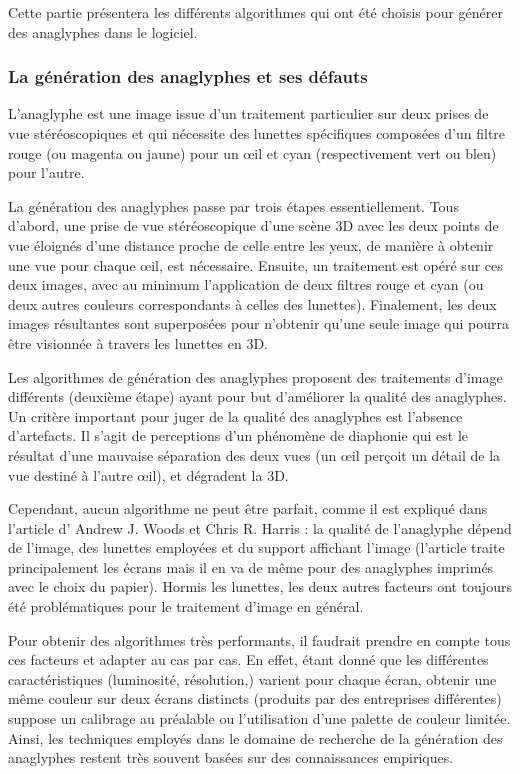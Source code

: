 Cette partie présentera les différents algorithmes qui ont été choisis pour générer des anaglyphes dans le logiciel.

\subsubsection{La génération des anaglyphes et ses défauts}
	L'anaglyphe est une image issue d'un traitement particulier sur deux prises de vue stéréoscopiques et qui nécessite des lunettes spécifiques composées d'un filtre rouge (ou magenta ou jaune) pour un \oe il et cyan (respectivement vert ou bleu) pour l'autre. 
	
	La génération des anaglyphes passe par trois étapes essentiellement. Tous d'abord, une prise de vue stéréoscopique d'une scène 3D avec les deux points de vue éloignés d'une distance proche de celle entre les yeux, de manière à obtenir une vue pour chaque \oe il, est nécessaire. Ensuite, un traitement est opéré sur ces deux images, avec au minimum l'application de deux filtres rouge et cyan (ou deux autres couleurs correspondants à celles des lunettes). Finalement, les deux images résultantes sont superposées pour n'obtenir qu'une seule image qui pourra être visionnée à travers les lunettes en 3D.
	
	Les algorithmes de génération des anaglyphes proposent des traitements d'image différents (deuxième étape) ayant pour but d'améliorer la qualité des anaglyphes. Un critère important pour juger de la qualité des anaglyphes est l'absence d'artefacts. Il s'agit de perceptions d'un phénomène de diaphonie qui est le résultat d'une mauvaise séparation des deux vues (un \oe il perçoit un détail de la vue destiné à l'autre \oe il), et dégradent la 3D. %

	Cependant, aucun algorithme ne peut être parfait, comme il est expliqué dans l'article d' Andrew J. Woods et Chris R. Harris \cite{anaglypheDefaut}  : la qualité de l'anaglyphe dépend de l'image, des lunettes employées et du support affichant l'image (l'article traite principalement les écrans mais il en va de même pour des anaglyphes imprimés avec le choix du papier). Hormis les lunettes, les deux autres facteurs ont toujours été problématiques pour le traitement d'image en général.  
	
	Pour obtenir des algorithmes très performants, il faudrait prendre en compte tous ces facteurs et adapter au cas par cas. En effet, étant donné que les différentes caractéristiques (luminosité, résolution,) varient pour chaque écran, obtenir une même couleur sur deux écrans distincts (produits par des entreprises différentes) suppose un calibrage au préalable ou l'utilisation d'une palette de couleur limitée. Ainsi, les techniques employés dans le domaine de recherche de la génération des anaglyphes restent très souvent basées sur des connaissances empiriques.
		
